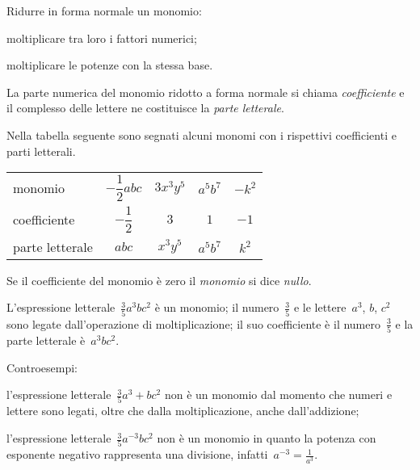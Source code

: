 \begin{procedura}
 Ridurre in forma normale un monomio:
 \begin{enumeratea}
 \item moltiplicare tra loro i fattori numerici;
 \item moltiplicare le potenze con la stessa base.
 \end{enumeratea}
\end{procedura}

\ovalbox{\risolvi \ref{ese:10.2}}

\begin{definizione}
La parte numerica del monomio ridotto a forma normale si chiama \emph{coefficiente} e
il complesso delle lettere ne costituisce la \emph{parte letterale}.
\end{definizione}

\begin{exrig}
 \begin{esempio}
 Nella tabella seguente sono segnati alcuni monomi con i rispettivi coefficienti e parti letterali.
\begin{center}
 \begin{tabular}{lcccc}
 \toprule
 monomio & $-{\dfrac{1}{2}}abc$ & $3x^{3}y^{5}$ & $a^{5}b^{7}$ & $-k^{2}$\\
coefficiente & $-{\dfrac{1}{2}}$ & $3$ & $1$ & $-1$ \\
parte letterale & $abc$ & $x^{3}y^{5}$ & $a^{5}b^{7}$ & $k^{2}$ \\
 \bottomrule
\end{tabular}
\end{center}
 \end{esempio}
\end{exrig}

\begin{definizione}
Se il coefficiente del monomio è zero il \emph{monomio} si dice \emph{nullo}.
\end{definizione}

\begin{exrig}
 \begin{esempio}
L'espressione letterale~$\frac{3}{5}a^{3}bc^{2}$ è un monomio;
il numero~$\frac{3}{5}$ e le lettere~$a^{3}$, $b$, $c^{2}$ sono legate
dall'operazione di moltiplicazione; il suo coefficiente è il numero~$\frac{3}{5}$ e la parte letterale è~$a^{3}bc^{2}$.
 \end{esempio}

 \begin{esempio}
 Controesempi:

 \begin{enumeratea}
 \item l'espressione letterale~$\frac{3}{5}a^{3}+bc^{2}$
 non è un monomio dal momento che numeri e lettere sono legati, oltre
che dalla moltiplicazione, anche dall'addizione;
\item l'espressione letterale~$\frac{3}{5}a^{-3}bc^{2}$
non è un monomio in quanto la potenza con esponente negativo
rappresenta una divisione, infatti~$a^{-3}=\frac{1}{a^{3}}$.
\end{enumeratea}
 \end{esempio}
\end{exrig}

